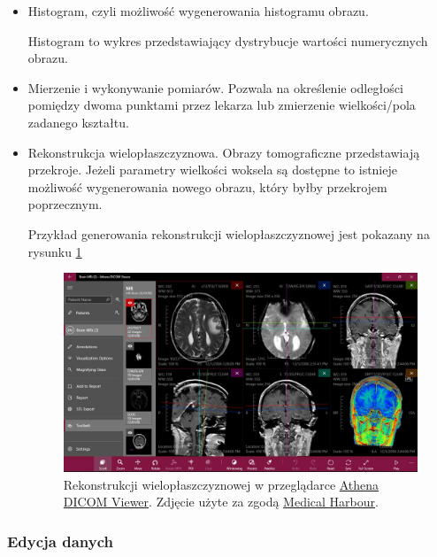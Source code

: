 \begin{itemize}
    \item Histogram, czyli możliwość wygenerowania histogramu obrazu.

          Histogram to wykres przedstawiający dystrybucje wartości numerycznych obrazu.

    \item Mierzenie i wykonywanie pomiarów.
          Pozwala na określenie odległości pomiędzy dwoma punktami przez lekarza lub zmierzenie wielkości/pola zadanego kształtu.

    \item Rekonstrukcja wielopłaszczyznowa.
          Obrazy tomograficzne przedstawiają przekroje.
          Jeżeli parametry wielkości woksela są dostępne to istnieje możliwość wygenerowania nowego obrazu, który byłby przekrojem poprzecznym.

          Przykład generowania rekonstrukcji wielopłaszczyznowej jest pokazany na rysunku \ref{fig:dicomviewer003}

          \begin{figure}[!htbp]
              \centering
              \includegraphics[width=\textwidth]{img/dicom-viewer-003.jpeg}
              \caption{Rekonstrukcji wielopłaszczyznowej w przeglądarce \href{https://athenadicomviewer.com/}{Athena DICOM Viewer}. Zdjęcie użyte za zgodą \href{https://medicalharbour.com/}{Medical Harbour}.}
              \label{fig:dicomviewer003}
          \end{figure}
\end{itemize}

\subsubsection{Edycja danych}


